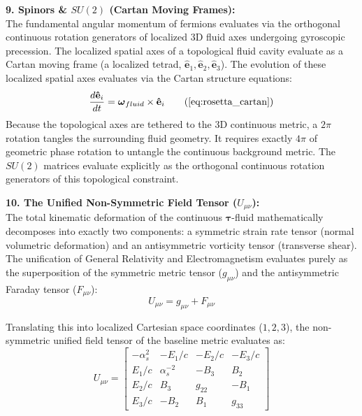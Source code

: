 \documentclass[11pt, a4paper]{article}
\begin{document}
\textbf{9. Spinors \& $SU(2)$ (Cartan Moving Frames):} \\
The fundamental angular momentum of fermions evaluates via the orthogonal continuous rotation generators of localized 3D fluid axes undergoing gyroscopic precession. The localized spatial axes of a topological fluid cavity evaluate as a Cartan moving frame (a localized tetrad, $\mathbf{\hat{e}}_1, \mathbf{\hat{e}}_2, \mathbf{\hat{e}}_3$). The evolution of these localized spatial axes evaluates via the Cartan structure equations:
\begin{equation}
    \frac{d\mathbf{\hat{e}}_i}{dt} = \boldsymbol{\omega}_{fluid} \times \mathbf{\hat{e}}_i \tag{\ref{eq:rosetta_cartan}}
\end{equation}
Because the topological axes are tethered to the 3D continuous metric, a $2\pi$ rotation tangles the surrounding fluid geometry. It requires exactly $4\pi$ of geometric phase rotation to untangle the continuous background metric. The $SU(2)$ matrices evaluate explicitly as the orthogonal continuous rotation generators of this topological constraint.

\textbf{10. The Unified Non-Symmetric Field Tensor ($U_{\mu\nu}$):} \\
The total kinematic deformation of the continuous $\boldsymbol{\tau}$-fluid mathematically decomposes into exactly two components: a symmetric strain rate tensor (normal volumetric deformation) and an antisymmetric vorticity tensor (transverse shear). The unification of General Relativity and Electromagnetism evaluates purely as the superposition of the symmetric metric tensor ($g_{\mu\nu}$) and the antisymmetric Faraday tensor ($F_{\mu\nu}$):
\begin{equation}
    U_{\mu\nu} = g_{\mu\nu} + F_{\mu\nu} 
\end{equation}

Translating this into localized Cartesian space coordinates ($1, 2, 3$), the non-symmetric unified field tensor of the baseline metric evaluates as:
\begin{equation}
    U_{\mu\nu} = \begin{bmatrix}
    -\alpha_s^2 & -E_1/c & -E_2/c & -E_3/c \\
    E_1/c & \alpha_s^{-2} & -B_3 & B_2 \\
    E_2/c & B_3 & g_{22} & -B_1 \\
    E_3/c & -B_2 & B_1 & g_{33}
    \end{bmatrix}
\end{equation}
\end{document}
